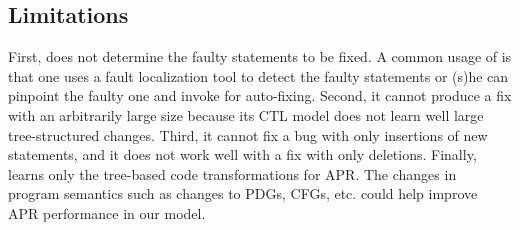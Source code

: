 \subsection{Limitations}
\label{sec:limitations}


First, {\tool} does not determine the faulty statements to be fixed.
A common usage of {\tool} is that one uses a fault localization tool
to detect the faulty statements or (s)he can pinpoint the faulty one
and invoke {\tool} for auto-fixing. Second, it cannot produce a fix
with an arbitrarily large size because its CTL model does not learn
well large tree-structured changes. Third, it cannot fix a bug with
only insertions of new statements, and it does not work well with a
fix with only deletions.
%
Finally, {\tool} learns only the tree-based code transformations for
APR. The changes in program semantics such as changes to PDGs, CFGs,
etc. could help improve APR performance in our model.

